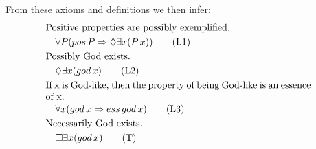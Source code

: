 \documentclass{llncs}
\begin{document}
\noindent
From these axioms and definitions we then infer:
\begin{align}
& \text{Positive properties are possibly exemplified.} \notag \\
& \quad \forall P (pos\,P \Rightarrow \Diamond \exists x (P\,x)) \tag{L1} \\
& \text{Possibly God exists.} \notag \\
& \quad \Diamond \exists x (god\,x) \tag{L2} \\
& \parbox[c][2em][c]{0.8\textwidth}{If x is God-like, then the property of being God-like is an essence of x.} \notag \\
& \quad \forall x (god\,x \Rightarrow ess\,god\,x) \tag{L3} \\
& \text{Necessarily God exists.} \notag \\
& \quad \Box \exists x (god\,x) \tag{T}
\end{align}


%

\end{document}
